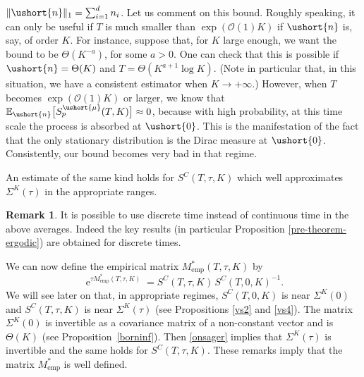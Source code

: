 \documentclass[JEP,XML,SOM,Unicode]{cedram}
\newcommand{\emp}{\mathrm{emp}}
\let\mathcal\mathscr
\numberwithin{equation}{section}
\theoremstyle{plain}
\theoremstyle{definition}
\newtheorem{remark}{Remark}[section]
\newcommand{\E}{{\mathbb{E}}}
\newcommand{\Oun}{\mathcal{O}(1)}
\newcommand{\sK}{K}
\newcommand{\vecn}{\ushort{n}}
\newcommand{\vmu}{\ushort{\mu}}
\newcommand{\veczer}{\ushort{0}}
\newcommand{\e}{\operatorname{e}}
\newcommand{\norm}[1]{\|#1\|_{1}}\let\snorm\norm
\begin{document}
$\norm{\vecn}=\sum_{i=1}^d n_i$.
Let us comment on this bound.
Roughly speaking, it can only be useful if $T$ is much smaller than $\exp(\Oun K)$ if $\vecn$ is, say, of order $K$.
For instance, suppose that, for $K$ large enough, we want the bound to be $\Theta(K^{-a})$, for some $a>0$. One can check that this is possible if
$\vecn=\Theta(K)$ and $T=\Theta(K^{a+1} \log K)$. (Note in particular that, in this situation, we have a consistent estimator when $K\to+\infty$.)
However, when $T$ becomes $\exp(\Oun K)$ or larger, we know that $\E_{\vecn}\bigl[S^{\vmu}_{p}(T,K)\bigr]\approx 0$, because with high
probability, at this time scale the process is absorbed at $\veczer$. This is the manifestation of the fact that the only stationary distribution is the Dirac
measure at $\veczer$. Consistently, our bound becomes very bad in that regime.

An estimate of the same kind holds for $S^{C}(T,\tau,K)$ which well approximates $\Sigma^{\sK}(\tau)$ in the appropriate ranges.

\begin{remark} It is possible to use discrete time instead of continuous time in the above averages. Indeed the key results (in particular Proposition
\ref{pre-theorem-ergodic}) are obtained for discrete times.
\end{remark}

We can now define the empirical matrix $M^{*}_\emp(T,\tau,K)$ by
\[
\e^{\tau M^{*}_\emp(T,\tau,K)}=S^{C}(T,\tau,K)\,S^{C}(T,0,K)^{-1}.
\]
We will see later on that, in appropriate regimes, $S^{C}(T,0,K)$ is near $\Sigma^K(0)$ and $S^{C}(T,\tau,K)$ is near $\Sigma^K(\tau)$
(see Propositions \ref{vs2} and \ref{vs4}). The matrix $\Sigma^K(0)$ is invertible as a covariance matrix of a non-constant vector and is $\Theta(K)$ (see Proposition~\ref{borninf}). Then \eqref{onsager} implies that $\Sigma^K(\tau)$ is invertible and the same holds for $S^{C}(T,\tau,K)$. These remarks imply
that the matrix $M^{*}_\emp$ is well defined.
\end{document}
